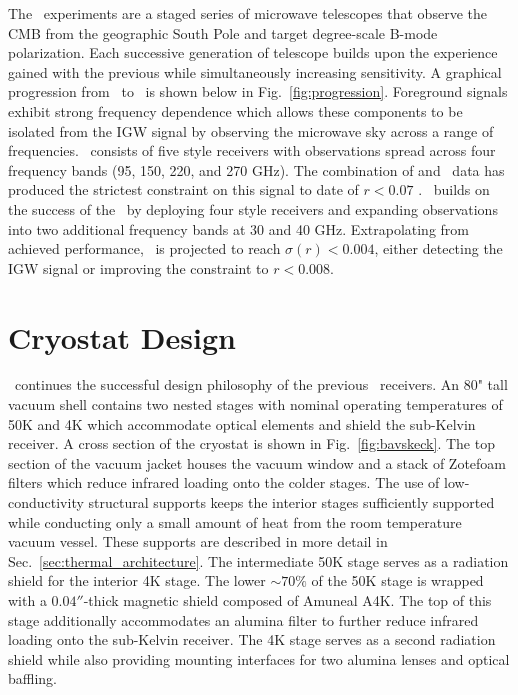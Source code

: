 \documentclass[]{spie}  %
\begin{document}
The \bk\ experiments are a staged series of microwave telescopes that observe
the CMB from the geographic South Pole and target degree-scale B-mode
polarization. Each successive generation of telescope builds upon the
experience gained with the previous while simultaneously increasing
sensitivity. A graphical progression from \ to \biceparray\ is shown
below in Fig.~\ref{fig:progression}. Foreground signals exhibit strong
frequency dependence which allows these components to be isolated from the IGW
signal by observing the microwave sky across a range of frequencies.
\keckarray\ consists of five  style receivers with observations spread
across four frequency bands (95, 150, 220, and 270 GHz). The combination of
  and \keckarray\ data has produced the strictest constraint on
this signal to date of $r<0.07$ \cite{bk_vi}. \biceparray\ builds on the success
of the \keckarray\ by deploying four  style receivers and expanding
observations into two additional frequency bands at 30 and 40 GHz.
Extrapolating from achieved performance, \biceparray\ is projected to reach
$\sigma(r)<0.004$, either detecting the IGW signal or improving the constraint
to $r<0.008$. 



	
\section{Cryostat Design}

\biceparray\ continues the successful design philosophy of
the previous \bk\ receivers. An 80" tall vacuum shell contains two nested
stages with nominal operating temperatures of 50K and 4K which accommodate
optical elements and shield the sub-Kelvin receiver. A cross section of
the cryostat is shown in Fig.~\ref{fig:bavskeck}. The top section of the
vacuum jacket houses the vacuum window and a stack of Zotefoam filters which reduce infrared loading
onto the colder stages. The use of low-conductivity structural supports keeps
the interior stages sufficiently supported while conducting only a small
amount of heat from the room temperature vacuum vessel. These supports are
described in more detail in Sec.~\ref{sec:thermal_architecture}. The
intermediate 50K stage serves as a radiation shield for the interior 4K stage.
The lower $\sim70\%$ of the 50K stage is wrapped with a $0.04''$-thick magnetic
shield composed of Amuneal A4K. The top of this stage additionally
accommodates an alumina filter to further reduce infrared loading onto the
sub-Kelvin receiver. The 4K stage serves as a second radiation shield while
also providing mounting interfaces for two alumina lenses and optical
baffling.
\end{document}
